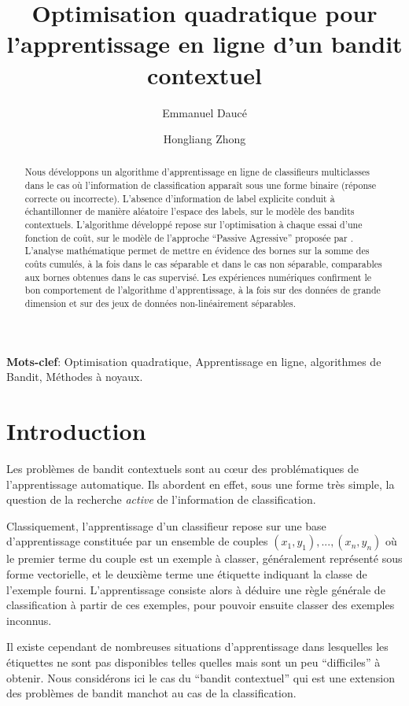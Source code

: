 \documentclass[twocolumn]{article}
\title{Optimisation quadratique pour l'apprentissage en ligne d'un bandit contextuel}
\author[1,2]{Emmanuel Daucé}
\author[1]{Hongliang Zhong}
\affil[1]{Ecole Centrale de Marseille, Marseille}
\affil[2]{Institut de Neurosciences des Systèmes, Aix-Marseille Université, Marseille}
\begin{document}
\maketitle

\begin{abstract}
  Nous développons un algorithme d'apprentissage en ligne de classifieurs multiclasses dans le cas où l'information de classification apparaît sous une forme binaire (réponse correcte ou incorrecte). L'absence d'information de label explicite conduit à échantillonner de manière aléatoire l'espace des labels, sur le modèle des bandits contextuels. 
  L'algorithme développé repose  sur l'optimisation à chaque essai d'une fonction de coût, sur le modèle de l'approche ``Passive Agressive'' proposée par \cite{crammer2006online}. 
  L'analyse mathématique permet de mettre en évidence des bornes sur la somme des coûts cumulés, à la fois dans le cas séparable et dans le cas non séparable, comparables aux bornes obtenues dans le cas supervisé. 
  Les expériences numériques confirment le bon comportement de l'algorithme d'apprentissage, à la fois sur des données de grande dimension et sur des jeux de données non-linéairement séparables. 
\end{abstract}

\medskip

\noindent\textbf{Mots-clef}: Optimisation quadratique, Apprentissage en ligne, algorithmes de Bandit, Méthodes à noyaux.

\section{Introduction}
\label{sec:lentete}

Les problèmes de bandit contextuels sont au cœur des problématiques de l’apprentissage automatique. Ils abordent en effet, sous une forme très simple, la question de la recherche \emph{active} de l'information de classification. 

Classiquement, l'apprentissage d'un classifieur repose sur une base d'apprentissage constituée par un ensemble de couples $(x_1,y_1),..., (x_n,y_n)$ où le premier terme du couple est un exemple à classer, généralement représenté sous forme vectorielle,  et le deuxième terme une étiquette indiquant la classe de l'exemple fourni.
L'apprentissage consiste alors à déduire une règle générale de classification à partir de ces exemples, pour pouvoir ensuite classer des exemples inconnus.

Il existe cependant de nombreuses situations d'apprentissage dans lesquelles les étiquettes ne sont pas disponibles telles quelles mais sont un peu ``difficiles'' à obtenir. Nous considérons ici le cas du ``bandit contextuel'' qui est une extension des problèmes de bandit manchot au cas de la classification. 
\end{document}
